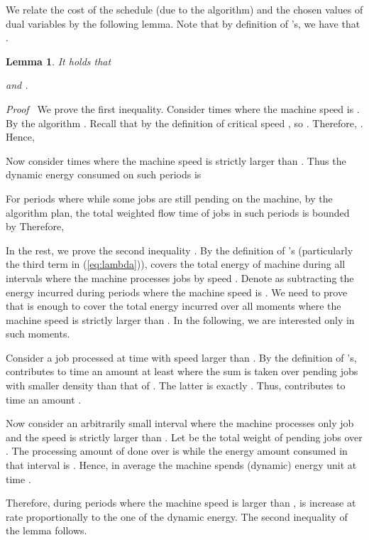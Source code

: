 \documentclass[11pt]{article}
\newenvironment{proof}{\noindent\emph{Proof\ }}{\hspace*{\fill}\medskip}
\newtheorem{lemma}{Lemma}
\begin{document}
We relate the cost of the schedule (due to the algorithm) and the chosen values of dual variables by the 
following lemma. Note that by definition of 's, we have that 
.

\begin{lemma}		\label{lem:general-energy-lambda}
It holds that

and
.
\end{lemma}
\begin{proof}
We prove the first inequality.
Consider times  where the machine speed is .   
By the algorithm .
Recall that by the definition of critical speed ,
so . Therefore,
. Hence,


Now consider times  where the machine speed is 
strictly larger than . Thus
the dynamic energy consumed on such periods is


For periods where  while some jobs are still pending
on the machine, by the algorithm plan, the total weighted flow time of jobs in such periods 
is bounded by 
Therefore,



In the rest, we prove the second inequality .
By the definition of 's (particularly the third term in (\ref{eq:lambda})),
 covers the total energy of machine during all intervals where 
the machine processes jobs by speed . Denote  as 
 subtracting the energy incurred during periods where the machine 
speed is . We need to prove that   is enough to cover the total energy 
incurred over all moments where the machine speed is strictly larger than .  
In the following, we are interested only in such moments.

Consider a job  processed at time  with speed larger than . 
By the definition of 's, 
 contributes to time  an amount at least  where
the sum is taken over pending jobs  with smaller density than that of .
The latter is exactly . Thus,  contributes to time 
an amount .

Now consider an arbitrarily small interval  where the machine processes only job 
and the speed is strictly larger than .
Let  be the total weight of pending jobs over .  The processing 
amount of  done over  is  while the 
energy amount consumed in that interval is . Hence, 
in average the machine spends  
(dynamic) energy unit at time .     

Therefore, during periods where the machine speed is larger than ,
 is increase at rate proportionally to the one of the dynamic energy.
The second inequality of the lemma follows.
\end{proof}
\end{document}
